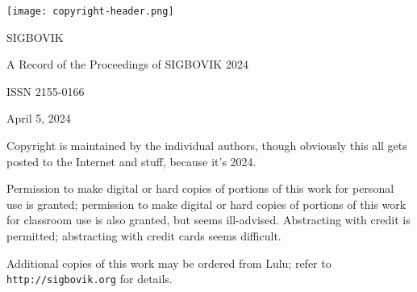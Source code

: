 \documentclass[12pt]{article}
\begin{document}
\newcommand\thisyear{2024}

\texttt{[image: copyright-header.png]}\\
\vspace{10em}

SIGBOVIK

A Record of the Proceedings of SIGBOVIK \thisyear

ISSN 2155-0166

April 5, \thisyear

\vspace{2em}

Copyright is maintained by the individual authors, though obviously this all gets posted to the Internet and stuff, because it's \thisyear.

Permission to make digital or hard copies of portions of this work for personal use is granted; permission to make digital or hard copies of portions of this work for classroom use is also granted, but seems ill-advised.
Abstracting with credit is permitted; abstracting with credit cards seems difficult.

Additional copies of this work may be ordered from Lulu; refer to {\tt http://sigbovik.org} for details.

\thispagestyle{empty}
\end{document}
